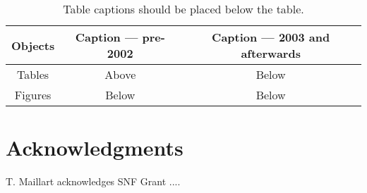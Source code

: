 \documentclass{sigchi}
\newcommand\tabhead[1]{\small\textbf{#1}}
\begin{document}
\begin{table}
  \centering
  \begin{tabular}{|c|c|c|}
    \hline
    \tabhead{Objects} &
    \multicolumn{1}{|p{0.3\columnwidth}|}{\centering\tabhead{Caption --- pre-2002}} &
    \multicolumn{1}{|p{0.4\columnwidth}|}{\centering\tabhead{Caption --- 2003 and afterwards}} \\
    \hline
    Tables & Above & Below \\
    \hline
    Figures & Below & Below \\
    \hline
  \end{tabular}
  \caption{Table captions should be placed below the table.}
  \label{tab:table1}
\end{table}


\section{Acknowledgments}
T. Maillart acknowledges SNF Grant ....
\balance




\end{document}
